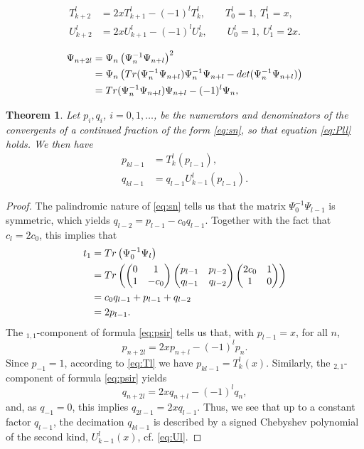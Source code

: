 \documentclass[10pt,a4paper]{amsart}
\newtheorem{theorem}{Theorem}
\def\Det{{\rm det}}
\def\Tr{{\rm Tr}}
\begin{document}
\begin{align}
T^l_{k+2}&=2xT^l_{k+1}-(-1)^lT^l_k,\qquad T^l_0=1,\ T^l_1=x,\label{eq:Tl}\\
U^l_{k+2}&=2xU^l_{k+1}-(-1)^lU^l_k,\qquad U^l_0=1,\ U^l_1=2x.\label{eq:Ul}
\end{align}

\begin{align}
\Psi_{n+2l}&=\Psi_n\left(\Psi_n^{-1}\Psi_{n+l}\right)^2\notag\\
&=\Psi_n\left(\Tr(\Psi_n^{-1}\Psi_{n+l})\Psi_n^{-1}\Psi_{n+l}-\Det(\Psi_n^{-1}\Psi_{n+l})\right)\notag\\
&=\Tr(\Psi_n^{-1}\Psi_{n+l})\Psi_{n+l}-(-1)^l\Psi_{n},\label{eq:psir}
\end{align}

\begin{theorem} \label{thm:tcs}
Let $p_i,q_i$, $i=0,1,\ldots$, be the numerators and denominators of the convergents of a continued fraction of the form \eqref{eq:sn}, so that equation \eqref{eq:Pll} holds. We then have
\begin{equation} \label{eq:pqC}
\begin{split}
p_{kl-1}&=T^l_k(p_{l-1}),\\
q_{kl-1}&=q_{l-1}U^l_{k-1}(p_{l-1}).
\end{split}
\end{equation}
\end{theorem}

\begin{proof}
The palindromic nature of \eqref{eq:sn} tells us that the matrix $\Psi_0^{-1}\Psi_{l-1}$ is symmetric, which yields $q_{l-2}=p_{l-1}-c_0q_{l-1}$. Together with the fact that
$c_l=2c_0$, this implies that
\begin{align*}
t_1&=\Tr\left(\Psi_0^{-1}\Psi_{l}\right)\\
&=\Tr\left(
\begin{pmatrix} 0 & 1 \\ 1 & -c_0 \end{pmatrix}
\begin{pmatrix} p_{l-1} & p_{l-2} \\ q_{l-1} & q_{l-2} \end{pmatrix}
\begin{pmatrix} 2c_0 & 1 \\ 1 & 0 \end{pmatrix}\right)\\
&=c_0q_{l-1}+p_{l-1}+q_{l-2}\\
&=2p_{l-1}.
\end{align*}
The ${}_{1,1}$-component of formula \eqref{eq:psir} tells us that, with $p_{l-1}=x$, for all $n$,
\[
p_{n+2l}=2xp_{n+l}-(-1)^lp_{n}.
\]
Since $p_{-1}=1$, according to \eqref{eq:Tl} we have $p_{kl-1}=T^l_k(x)$.
Similarly, the ${}_{2,1}$-component of formula \eqref{eq:psir} yields
\[
q_{n+2l}=2xq_{n+l}-(-1)^lq_{n},
\]
and, as $q_{-1}=0$, this implies $q_{2l-1}=2xq_{l-1}$. Thus, we see that up to a constant factor $q_{l-1}$, the decimation $q_{kl-1}$ is described by a signed Chebyshev polynomial of the second kind, $U^l_{k-1}(x)$, cf. \eqref{eq:Ul}.
\end{proof}
\end{document}

